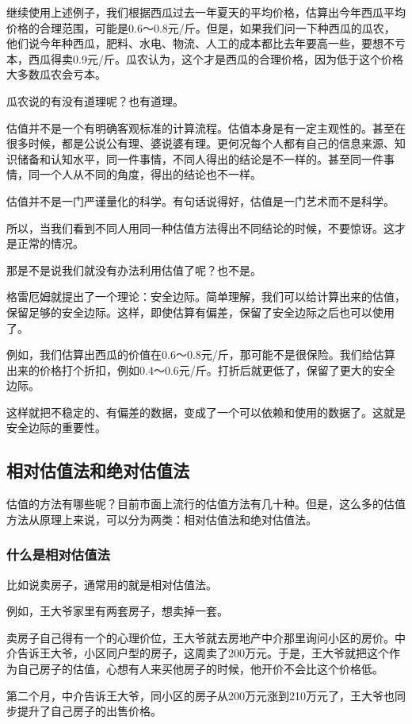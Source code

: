 继续使用上述例子，我们根据西瓜过去一年夏天的平均价格，估算出今年西瓜平均价格的合理范围，可能是0.6～0.8元/斤。但是，如果我们问一下种西瓜的瓜农，他们说今年种西瓜，肥料、水电、物流、人工的成本都比去年要高一些，要想不亏本，西瓜得卖0.9元/斤。瓜农认为，这个才是西瓜的合理价格，因为低于这个价格大多数瓜农会亏本。

瓜农说的有没有道理呢？也有道理。

估值并不是一个有明确客观标准的计算流程。估值本身是有一定主观性的。甚至在很多时候，都是公说公有理、婆说婆有理。更何况每个人都有自己的信息来源、知识储备和认知水平，同一件事情，不同人得出的结论是不一样的。甚至同一件事情，同一个人从不同的角度，得出的结论也不一样。

估值并不是一门严谨量化的科学。有句话说得好，估值是一门艺术而不是科学。

所以，当我们看到不同人用同一种估值方法得出不同结论的时候，不要惊讶。这才是正常的情况。

那是不是说我们就没有办法利用估值了呢？也不是。

格雷厄姆就提出了一个理论：安全边际。简单理解，我们可以给计算出来的估值，保留足够的安全边际。这样，即使估算有偏差，保留了安全边际之后也可以使用了。

例如，我们估算出西瓜的价值在0.6～0.8元/斤，那可能不是很保险。我们给估算出来的价格打个折扣，例如0.4～0.6元/斤。打折后就更低了，保留了更大的安全边际。

这样就把不稳定的、有偏差的数据，变成了一个可以依赖和使用的数据了。这就是安全边际的重要性。

\subsection{相对估值法和绝对估值法}
估值的方法有哪些呢？目前市面上流行的估值方法有几十种。但是，这么多的估值方法从原理上来说，可以分为两类：相对估值法和绝对估值法。

\subsubsection{什么是相对估值法}

比如说卖房子，通常用的就是相对估值法。

例如，王大爷家里有两套房子，想卖掉一套。

卖房子自己得有一个的心理价位，王大爷就去房地产中介那里询问小区的房价。中介告诉王大爷，小区同户型的房子，这周卖了200万元。于是，王大爷就把这个作为自己房子的估值，心想有人来买他房子的时候，他开价不会比这个价格低。

第二个月，中介告诉王大爷，同小区的房子从200万元涨到210万元了，王大爷也同步提升了自己房子的出售价格。


